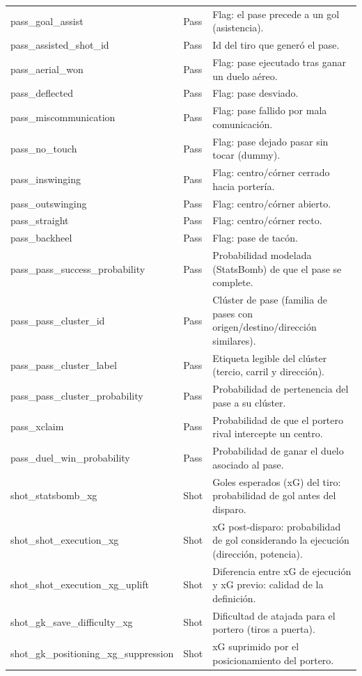 {\begin{longtable}{p{4.3cm}p{2.2cm}p{8.8cm}}
pass\_goal\_assist & Pass & Flag: el pase precede a un gol (asistencia). \\
pass\_assisted\_shot\_id & Pass & Id del tiro que generó el pase. \\
pass\_aerial\_won & Pass & Flag: pase ejecutado tras ganar un duelo aéreo. \\
pass\_deflected & Pass & Flag: pase desviado. \\
pass\_miscommunication & Pass & Flag: pase fallido por mala comunicación. \\
pass\_no\_touch & Pass & Flag: pase dejado pasar sin tocar (dummy). \\
pass\_inswinging & Pass & Flag: centro/córner cerrado hacia portería. \\
pass\_outswinging & Pass & Flag: centro/córner abierto. \\
pass\_straight & Pass & Flag: centro/córner recto. \\
pass\_backheel & Pass & Flag: pase de tacón. \\
pass\_pass\_success\_probability & Pass & Probabilidad modelada (StatsBomb) de que el pase se complete. \\
pass\_pass\_cluster\_id & Pass & Clúster de pase (familia de pases con origen/destino/dirección similares). \\
pass\_pass\_cluster\_label & Pass & Etiqueta legible del clúster (tercio, carril y dirección). \\
pass\_pass\_cluster\_probability & Pass & Probabilidad de pertenencia del pase a su clúster. \\
pass\_xclaim & Pass & Probabilidad de que el portero rival intercepte un centro. \\
pass\_duel\_win\_probability & Pass & Probabilidad de ganar el duelo asociado al pase. \\
shot\_statsbomb\_xg & Shot & Goles esperados (xG) del tiro: probabilidad de gol antes del disparo. \\
shot\_shot\_execution\_xg & Shot & xG post-disparo: probabilidad de gol considerando la ejecución (dirección, potencia). \\
shot\_shot\_execution\_xg\_uplift & Shot & Diferencia entre xG de ejecución y xG previo: calidad de la definición. \\
shot\_gk\_save\_difficulty\_xg & Shot & Dificultad de atajada para el portero (tiros a puerta). \\
shot\_gk\_positioning\_xg\_suppression & Shot & xG suprimido por el posicionamiento del portero. \\

\end{longtable}}
